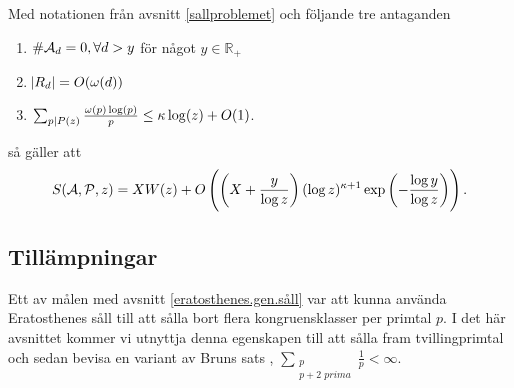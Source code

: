 \begin{theorem}\label{thm:EratosthenesSieve}
Med notationen från avsnitt \ref{sallproblemet} och följande tre antaganden 
\begin{enumerate}
    \item \(\card{\A_d} = 0, \forall d > y\) för något \(y \in \mathbb{R}_+\)
    \item \(\abs{R_d} = O(\omega(d))\)
    \item \(\sum_{p \divides P(z)} \frac{\omega(p) \log(p)}{p} \leq \kappa \log(z) + O(1)\).
\end{enumerate}
så gäller att
\begin{align*}
    \S{A}{P}{z} = X W(z) + O\left(\left(X + \frac{y}{\log z} \right) (\log z)^{\kappa + 1} \exp{\left(-\frac{\log y}{\log z}\right)} \right). 
\end{align*}

\end{theorem}


\subsection{Tillämpningar}


Ett av målen med avsnitt \ref{eratosthenes.gen.såll} var att kunna använda Eratosthenes såll till att sålla bort flera kongruensklasser per primtal $p$. I det här avsnittet kommer vi utnyttja denna egenskapen till att sålla fram tvillingprimtal och sedan bevisa en variant av Bruns sats \cite[Korollarium 5.4.5]{cojocarumurty}, \(\sum_{\substack{p \\ p + 2 \textit{ prima}}} \frac{1}{p} < \infty\).

